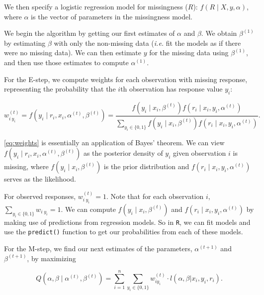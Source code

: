 \documentclass[12pt,twoside]{reedthesis}
\begin{document}
  We then specify a logistic regression model for missingness (\(R\)):
  \(f(R \;|\; X, y, \alpha)\), where \(\alpha\) is the vector of
  parameters in the missingness model.
  
  We begin the algorithm by getting our first estimates of \(\alpha\) and
  \(\beta\). We obtain \(\beta^{(1)}\) by estimating \(\beta\) with only
  the non-missing data (\emph{i.e.} fit the models as if there were no
  missing data). We can then estimate \(y\) for the missing data using
  \(\beta^{(1)}\), and then use those estimates to compute
  \(\alpha^{(1)}\).
  
  For the E-step, we compute weights for each observation with missing
  response, representing the probability that the \(i\)th observation has
  response value \(y_i\):
  
  \begin{equation}
  w_{i\: y_i}^{(t)} = 
  f(y_i \;|\; r_i, x_i, \alpha^{(t)}, \beta^{(t)}) =
  \frac{f(y_i \;|\; x_i, \beta^{(t)}) f(r_i \;|\; x_i, y_i, \alpha^{(t)})}{
  \sum_{y_i \in \{0,1\}}
  f(y_i \;|\; x_i, \beta^{(t)}) f(r_i \;|\; x_i, y_i, \alpha^{(t)})
  }.
  \label{eq:weights}
  \end{equation}
  
  \ref{eq:weights} is essentially an application of Bayes' theorem. We can
  view \(f(y_i \;|\; r_i, x_i, \alpha^{(t)}, \beta^{(t)})\) as the
  posterior density of \(y_i\) given observation \(i\) is missing, where
  \(f(y_i \;|\; x_i, \beta^{(t)})\) is the prior distribution and
  \(f(r_i \;|\; x_i, y_i, \alpha^{(t)})\) serves as the likelihood.
  
  For observed responses, \(w_{i\: y_i}^{(t)} = 1\). Note that for each
  observation \(i\), \(\sum_{y_i \in \{0,1\}} w_{i\; y_i} = 1.\) We can
  compute \(f(y_i \;|\; x_i, \beta^{(t)})\) and
  \(f(r_i \;|\; x_i, y_i, \alpha^{(t)})\) by making use of predictions
  from regression models. So in \texttt{R}, we can fit models and use the
  \texttt{predict()} function to get our probabilities from each of these
  models.
  
  For the M-step, we find our next estimates of the parameters,
  \(\alpha^{(t + 1)}\) and \(\beta^{(t + 1)}\), by maximizing
  
  \begin{equation}
  Q(\alpha, \beta \;|\; \alpha^{(t)}, \beta^{(t)}) =
  \sum_{i = 1}^n \sum_{y_i \in \{0,1\}} w_{iy_i}^{(t)} \cdot 
  l(\alpha, \beta | x_i, y_i, r_i).
  \end{equation}
  
\end{document}
